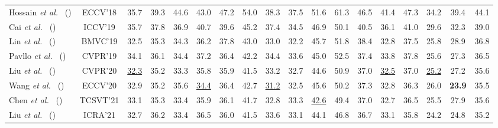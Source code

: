 \documentclass[sigconf]{acmart}
\newcommand{\etal}{\textit{et al.~}}
\begin{document}
\begin{table*}[!t]
{\begin{tabular}{lccccccccccccccccc}
\multicolumn{1}{l|}{Hossain \etal \cite{hossain2018exploiting} ()}     & \multicolumn{1}{c|}{ ECCV'18}     & 35.7   & 39.3  & 44.6 & 43.0  & 47.2  & 54.0  & 38.3 & 37.5   & 51.6 & 61.3  & 46.5  & 41.4 & 47.3   & 34.2 & \multicolumn{1}{c|}{39.4}   & 44.1    \\

\multicolumn{1}{l|}{Cai \etal \cite{cai2019exploiting} ()}   & \multicolumn{1}{c|}{ICCV'19}     & 35.7 & 37.8  & 36.9 & 40.7  & 39.6  & 45.2  & 37.4 & 34.5   & 46.9 & 50.1  & 40.5  & 36.1 & 41.0   & 29.6 & \multicolumn{1}{c|}{32.3}   & 39.0    \\

\multicolumn{1}{l|}{Lin \etal \cite{lin2019trajectory} ()}    & \multicolumn{1}{c|}{BMVC'19}    & 32.5 & 35.3  & 34.3 & 36.2  & 37.8  & 43.0  & 33.0 & 32.2   & 45.7 & 51.8  & 38.4  & 32.8 & 37.5   & 25.8 & \multicolumn{1}{c|}{28.9}   & 36.8    \\

\multicolumn{1}{l|}{Pavllo \etal \cite{pavllo20193d} ()}  & \multicolumn{1}{c|}{CVPR'19 } & 34.1 & 36.1  & 34.4 & 37.2  & 36.4  & 42.2  & 34.4 & 33.6   & 45.0 & 52.5  & 37.4  & 33.8 & 37.8   & 25.6 & \multicolumn{1}{c|}{27.3}   & 36.5    \\

\multicolumn{1}{l|}{Liu \etal \cite{liu2020attention} ()}   & \multicolumn{1}{c|}{CVPR'20 }  & \underline{32.3} &  35.2  & 33.3 & 35.8  & 35.9  & 41.5  & 33.2 & 32.7   & 44.6 & 50.9  & 37.0  & \underline{32.5} & 37.0   &  \underline{25.2} & \multicolumn{1}{c|}{27.2}   & 35.6    \\  		

\multicolumn{1}{l|}{Wang \etal \cite{wang2020motion} ()}   & \multicolumn{1}{c|}{ECCV'20}   & 32.9 &  35.2  & 35.6 & \underline{34.4}  & 36.4  & 42.7  & \underline{31.2} & 32.5   & 45.6 & 50.2  & 37.3  & 32.8 & 36.3   & 26.0 & \multicolumn{1}{c|}{\textbf{23.9}}   & 35.5    \\

\multicolumn{1}{l|}{Chen \etal \cite{chen2021anatomy} ()}  & \multicolumn{1}{c|}{TCSVT'21 } & 33.1 & 35.3  & 33.4 & 35.9  & 36.1  & 41.7  & 32.8 & 33.3   & \underline{42.6} & 49.4  & 37.0  & 32.7 & 36.5   & 25.5 & \multicolumn{1}{c|}{27.9}   & 35.6    \\ 
\hline
\multicolumn{1}{l|}{Liu \etal \cite{liu2020attention} ()}    & \multicolumn{1}{c|}{ICRA'21} & 32.7 & 36.2 & 33.4 & 36.5 & 36.0 & 41.5 & 33.6 & 33.1 & 44.1 & 46.8 & 36.7 & 33.1 & 35.8  & 24.2 & \multicolumn{1}{c|}{24.8} & 35.2 \\


\end{tabular}}
\end{table*}
\end{document}
